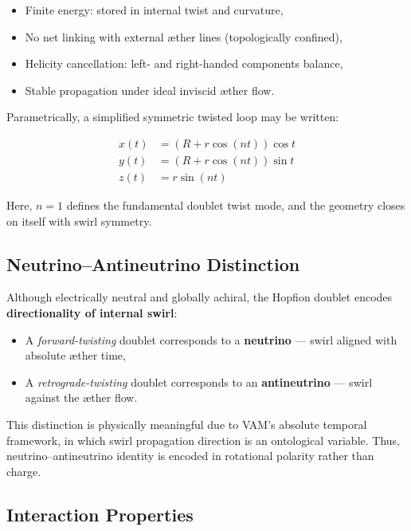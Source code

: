 \documentclass[preprint]{revtex4-2}
\begin{document}
\begin{itemize}
    \item Finite energy: stored in internal twist and curvature,
    \item No net linking with external æther lines (topologically confined),
    \item Helicity cancellation: left- and right-handed components balance,
    \item Stable propagation under ideal inviscid æther flow.
\end{itemize}

Parametrically, a simplified symmetric twisted loop may be written:

\begin{equation}
\begin{aligned}
x(t) &= \left( R + r \cos(n t) \right) \cos t \\
y(t) &= \left( R + r \cos(n t) \right) \sin t \\
z(t) &= r \sin(n t)
\end{aligned}
\end{equation}

Here, \(n = 1\) defines the fundamental doublet twist mode, and the geometry closes on itself with swirl symmetry.

\subsection{Neutrino–Antineutrino Distinction}

Although electrically neutral and globally achiral, the Hopfion doublet encodes \textbf{directionality of internal swirl}:

\begin{itemize}
    \item A \emph{forward-twisting} doublet corresponds to a \textbf{neutrino} — swirl aligned with absolute æther time,
    \item A \emph{retrograde-twisting} doublet corresponds to an \textbf{antineutrino} — swirl against the æther flow.
\end{itemize}

This distinction is physically meaningful due to VAM’s absolute temporal framework, in which swirl propagation direction is an ontological variable. Thus, neutrino–antineutrino identity is encoded in rotational polarity rather than charge.

\subsection{Interaction Properties}
\end{document}
